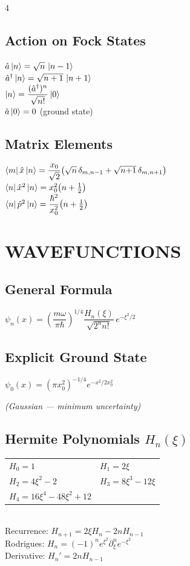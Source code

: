 \documentclass[10pt,landscape,a4paper]{article}
\newcommand{\aop}{\hat{a}}
\newcommand{\adop}{\hat{a}^{\dagger}}
\newcommand{\xop}{\hat{x}}
\newcommand{\pop}{\hat{p}}
\newcommand{\xzero}{x_0}
\newcommand{\half}{\tfrac{1}{2}}
\begin{document}
\begin{multicols}{4}
\subsection{Action on Fock States}
\begin{keybox}
$\aop\ket{n} = \sqrt{n}\,\ket{n-1}$\\[3pt]
$\adop\ket{n} = \sqrt{n+1}\,\ket{n+1}$\\[3pt]
$\ket{n} = \dfrac{(\adop)^n}{\sqrt{n!}}\ket{0}$\\[3pt]
$\aop\ket{0} = 0$ \quad (ground state)
\end{keybox}

\subsection{Matrix Elements}
$\bra{m}\xop\ket{n} = \dfrac{\xzero}{\sqrt{2}}\!\left(\sqrt{n}\,\delta_{m,n-1}+\sqrt{n{+}1}\,\delta_{m,n+1}\right)$\\[3pt]
$\bra{n}\xop^2\ket{n} = \xzero^2\!\left(n+\half\right)$\\[3pt]
$\bra{n}\pop^2\ket{n} = \dfrac{\hbar^2}{\xzero^2}\!\left(n+\half\right)$

\section{WAVEFUNCTIONS}

\subsection{General Formula}
\begin{keybox}
$\psi_n(x) = \!\left(\!\dfrac{m\omega}{\pi\hbar}\!\right)^{\!1/4}\!\dfrac{H_n(\xi)}{\sqrt{2^n n!}}\,e^{-\xi^2/2}$
\end{keybox}

\subsection{Explicit Ground State}
$\psi_0(x) = \left(\pi\xzero^2\right)^{-1/4}\!e^{-x^2/2\xzero^2}$

\textit{(Gaussian — minimum uncertainty)}

\subsection{Hermite Polynomials $H_n(\xi)$}
\begin{tabular}{ll}
$H_0 = 1$ & $H_1 = 2\xi$ \\
$H_2 = 4\xi^2-2$ & $H_3 = 8\xi^3-12\xi$ \\
$H_4 = 16\xi^4-48\xi^2+12$ &
\end{tabular}\\[2pt]
Recurrence: $H_{n+1} = 2\xi H_n - 2nH_{n-1}$\\
Rodrigues: $H_n = (-1)^n e^{\xi^2}\partial_\xi^n e^{-\xi^2}$\\
Derivative: $H_n' = 2nH_{n-1}$


\end{multicols}
\end{document}
